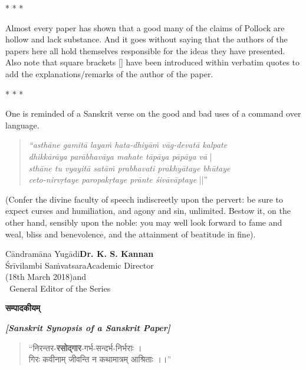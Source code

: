 \begin{center}
* * *
\end{center}

Almost every paper has shown that a good many of the claims of Pollock are hollow and lack substance. And it goes without saying that the authors of the papers here all hold themselves responsible for the ideas they have presented. Also note that square brackets [] have been introduced within verbatim quotes to add the explanations/remarks of the author of the paper.

\begin{center}
* * *
\end{center}

One is reminded of a Sanskrit verse on the good and bad uses of a command over language.
\begin{quote}
\textsl{“asthāne gamitā layaṁ hata-dhiyāṁ vāg-devatā kalpate}\\
\phantom{aaaaaa}\textsl{dhikkārāya parābhavāya mahate tāpāya pāpāya vā} |\\
\textsl{sthāne tu vyayitā satāṁ prabhavati prakhyātaye bhūtaye}\\
\phantom{aaaaaa}\textsl{ceto-nirvṛtaye paropakṛtaye prānte śivāvāptaye} ||”
\end{quote}

\begin{normalmyquote}
(Confer the divine faculty of speech indiscreetly upon the pervert: be sure to expect curses and humiliation, and agony and sin, unlimited. Bestow it, on the other hand, sensibly upon the noble: you may well look forward to fame and weal, bliss and benevolence, and the attainment of beatitude in fine).
\end{normalmyquote}

\bigskip
\noindent
Cāndramāna Yugādi\hfill {\bf Dr. K. S. Kannan}\\
Śrīvilambi Saṁvatsara\hfill Academic Director\\
(18th March 2018)\hfill	and\\
~\phantom{a}\hfill  General Editor of the Series

\newpage

{\large\dev\bfseries सम्पादकीयम् }

\smallskip
 
\textsl{\textbf{[Sanskrit Synopsis of a Sanskrit Paper]}}
\label{editorial1}

\begin{quote}
{\dev ``निरन्तर-{\bfseries रसोद्गार}-गर्भ-सन्दर्भ-निर्भराः ।}\\[2pt]
{\dev गिरः कवीनाम् जीवन्ति न कथामात्रम् आश्रिताः ।।''}
\end{quote}
 
